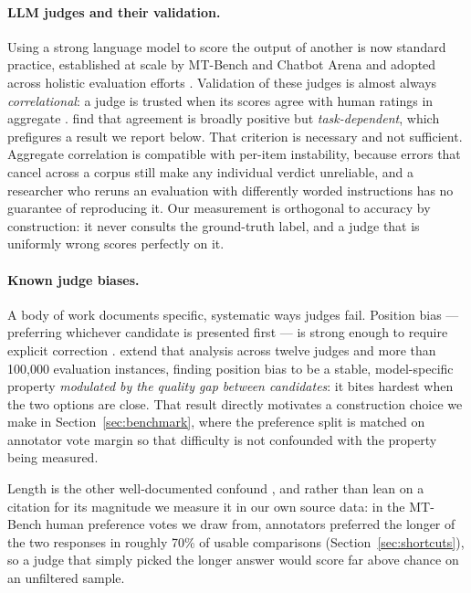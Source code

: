 \documentclass[11pt]{article}          %
\begin{document}
\paragraph{LLM judges and their validation.}
Using a strong language model to score the output of another is now standard
practice, established at scale by MT-Bench and Chatbot Arena
\citep{zheng2023judging} and adopted across holistic evaluation efforts
\citep{liang2023holistic}. Validation of these judges is almost always
\emph{correlational}: a judge is trusted when its scores agree with human ratings
in aggregate \citep{chiang2023can, liu2023geval}. \citet{chiang2023can} find that
agreement is broadly positive but \emph{task-dependent}, which prefigures a result we
report below. That criterion is necessary and not sufficient. Aggregate
correlation is compatible with per-item instability, because errors that cancel
across a corpus still make any individual verdict unreliable, and a researcher who
reruns an evaluation with differently worded instructions has no guarantee of
reproducing it. Our measurement is orthogonal to accuracy by construction: it
never consults the ground-truth label, and a judge that is uniformly wrong scores
perfectly on it.

\paragraph{Known judge biases.}
A body of work documents specific, systematic ways judges fail. Position bias ---
preferring whichever candidate is presented first --- is strong enough to require
explicit correction \citep{wang2023fair}. \citet{shi2024judging} extend that
analysis across twelve judges and more than 100{,}000 evaluation instances,
finding position bias to be a stable, model-specific property \emph{modulated by
the quality gap between candidates}: it bites hardest when the two options are
close. That result directly motivates a construction choice we make in
Section~\ref{sec:benchmark}, where the preference split is matched on annotator
vote margin so that difficulty is not confounded with the property being measured.

Length is the other well-documented confound \citep{wang2023fair}, and rather
than lean on a citation for its magnitude we measure it in our own source data:
in the MT-Bench human preference votes we draw from, annotators preferred the
longer of the two responses in roughly 70\% of usable comparisons
(Section~\ref{sec:shortcuts}), so a judge that simply picked the longer answer
would score far above chance on an unfiltered sample.
\end{document}
